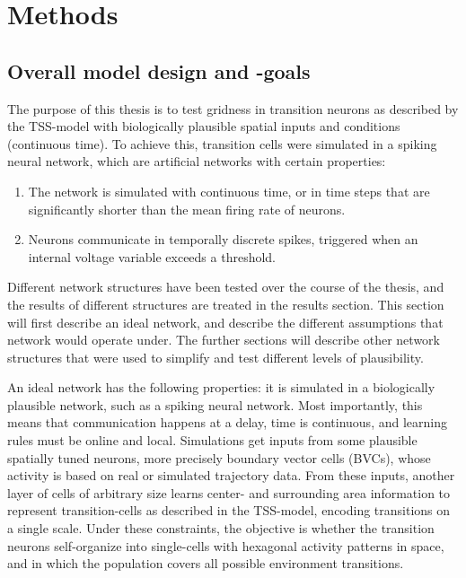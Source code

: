 \documentclass{article}
\begin{document}
    \section{Methods} 
    \subsection{Overall model design and -goals}
    The purpose of this thesis is to test gridness in transition neurons as described by the TSS-model with biologically plausible spatial inputs and conditions (continuous time). To achieve this, transition cells were simulated in a spiking neural network, which are artificial networks with certain properties:
    \begin{enumerate}
        \item The network is simulated with continuous time, or in time steps that are significantly shorter than the mean firing rate of neurons.
        \item Neurons communicate in temporally discrete spikes, triggered when an internal voltage variable exceeds a threshold.
    \end{enumerate}
    
    Different network structures have been tested over the course of the thesis, and the results of different structures are treated in the results section. This section will first describe an ideal network, and describe the different assumptions that network would operate under. The further sections will describe other network structures that were used to simplify and test different levels of plausibility.

    An ideal network has the following properties: it is simulated in a biologically plausible network, such as a spiking neural network. Most importantly, this means that communication happens at a delay, time is continuous, and learning rules must be online and local. Simulations get inputs from some plausible spatially tuned neurons, more precisely boundary vector cells (BVCs), whose activity is based on real or simulated trajectory data. From these inputs, another layer of cells of arbitrary size learns center- and surrounding area information to represent transition-cells as described in the TSS-model, encoding transitions on a single scale. Under these constraints, the objective is whether the transition neurons self-organize into single-cells with hexagonal activity patterns in space, and in which the population covers all possible environment transitions.
\end{document}
